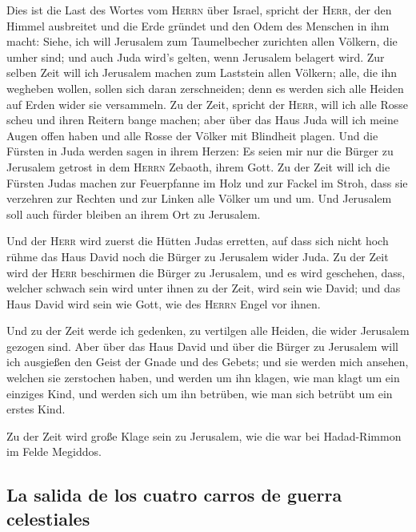  Dies ist die Last des Wortes vom \textsc{Herrn} über
Israel, spricht der \textsc{Herr}, der den Himmel ausbreitet und die
Erde gründet und den Odem des Menschen in ihm macht: 
Siehe, ich will Jerusalem zum Taumelbecher zurichten allen Völkern, die
umher sind; und auch Juda wird's gelten, wenn Jerusalem belagert wird.
 Zur selben Zeit will ich Jerusalem machen zum Laststein
allen Völkern; alle, die ihn wegheben wollen, sollen sich daran
zerschneiden; denn es werden sich alle Heiden auf Erden wider sie
versammeln.  Zu der Zeit, spricht der \textsc{Herr}, will
ich alle Rosse scheu und ihren Reitern bange machen; aber über das Haus
Juda will ich meine Augen offen haben und alle Rosse der Völker mit
Blindheit plagen.  Und die Fürsten in Juda werden sagen in
ihrem Herzen: Es seien mir nur die Bürger zu Jerusalem getrost in dem
\textsc{Herrn} Zebaoth, ihrem Gott.  Zu der Zeit will ich
die Fürsten Judas machen zur Feuerpfanne im Holz und zur Fackel im
Stroh, dass sie verzehren zur Rechten und zur Linken alle Völker um und
um. Und Jerusalem soll auch fürder bleiben an ihrem Ort zu Jerusalem.

 Und der \textsc{Herr} wird zuerst die Hütten Judas
erretten, auf dass sich nicht hoch rühme das Haus David noch die Bürger
zu Jerusalem wider Juda.  Zu der Zeit wird der
\textsc{Herr} beschirmen die Bürger zu Jerusalem, und es wird geschehen,
dass, welcher schwach sein wird unter ihnen zu der Zeit, wird sein wie
David; und das Haus David wird sein wie Gott, wie des \textsc{Herrn}
Engel vor ihnen.

 Und zu der Zeit werde ich gedenken, zu vertilgen alle
Heiden, die wider Jerusalem gezogen sind.  Aber über das
Haus David und über die Bürger zu Jerusalem will ich ausgießen den Geist
der Gnade und des Gebets; und sie werden mich ansehen, welchen sie
zerstochen haben, und werden um ihn klagen, wie man klagt um ein
einziges Kind, und werden sich um ihn betrüben, wie man sich betrübt um
ein erstes Kind.

 Zu der Zeit wird große Klage sein zu Jerusalem, wie die
war bei Hadad-Rimmon im Felde Megiddos.

\hypertarget{la-salida-de-los-cuatro-carros-de-guerra-celestiales}{%
\subsection{La salida de los cuatro carros de guerra
celestiales}\label{la-salida-de-los-cuatro-carros-de-guerra-celestiales}}

